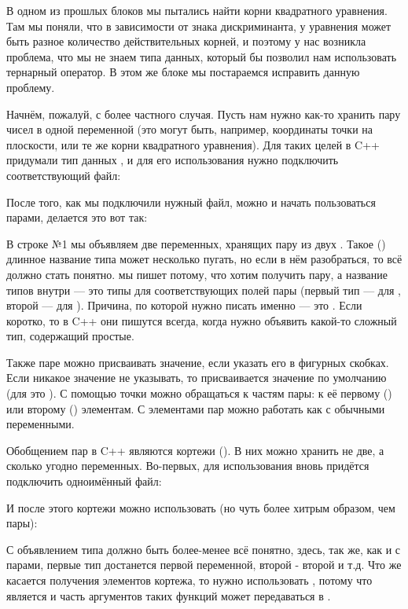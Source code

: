 В одном из прошлых блоков мы пытались найти корни квадратного уравнения. Там мы поняли, что в зависимости от знака дискриминанта, у уравнения может быть разное количество действительных корней, и поэтому у нас возникла проблема, что мы не знаем типа данных, который бы позволил нам использовать тернарный оператор. В этом же блоке мы постараемся исправить данную проблему.

Начнём, пожалуй, с более частного случая. Пусть нам нужно как-то хранить пару чисел в одной переменной (это могут быть, например, координаты точки на плоскости, или те же корни квадратного уравнения). Для таких целей в C++ придумали тип данных , и для его использования нужно подключить соответствующий файл:


После того, как мы подключили нужный файл, можно и начать пользоваться парами, делается это вот так:


В строке №1 мы объявляем две переменных, хранящих пару из двух . Такое () длинное название типа может несколько пугать, но если в нём разобраться, то всё должно стать понятно.  мы пишет потому, что хотим получить пару, а название типов внутри \lcpp{<>} — это типы для соответствующих полей пары (первый тип — для , второй — для ). Причина, по которой нужно писать именно \lcpp{<>} — это . Если коротко, то в C++ они пишутся всегда, когда нужно объявить какой-то сложный тип, содержащий простые. 

Также паре можно присваивать значение, если указать его в фигурных скобках. Если никакое значение не указывать, то присваивается значение по умолчанию (для  это ). С помощью точки можно обращаться к частям пары: к её первому () или второму () элементам. С элементами пар можно работать как с обычными переменными.

Обобщением пар в C++ являются кортежи (). В них можно хранить не две, а сколько угодно переменных. Во-первых, для использования  вновь придётся подключить одноимённый файл:


И после этого кортежи можно использовать (но чуть более хитрым образом, чем пары):


С объявлением типа должно быть более-менее всё понятно, здесь, так же, как и с парами, первые тип достанется первой переменной, второй - второй и т.д. Что же касается получения элементов кортежа, то нужно использовать , потому что  является  и часть аргументов таких функций может передаваться в \lcpp{<>}.


